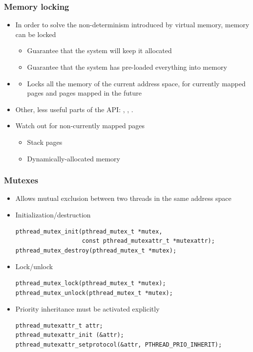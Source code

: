 \begin{frame}
  \frametitle{Memory locking}
  \begin{itemize}
  \item In order to solve the non-determinism introduced by virtual
    memory, memory can be locked
    \begin{itemize}
    \item Guarantee that the system will keep it allocated
    \item Guarantee that the system has pre-loaded everything into
      memory
    \end{itemize}
  \item {}
    \begin{itemize}
    \item Locks all the memory of the current address space, for
      currently mapped pages and pages mapped in the future
    \end{itemize}
  \item Other, less useful parts of the API: , ,
    .
  \item Watch out for non-currently mapped pages
    \begin{itemize}
    \item Stack pages
    \item Dynamically-allocated memory
    \end{itemize}
  \end{itemize}
\end{frame}

\begin{frame}[fragile]
  \frametitle{Mutexes}
  \begin{itemize}
  \item Allows mutual exclusion between two threads in the same
    address space
  \item Initialization/destruction
    \begin{block}{}
\footnotesize
\begin{verbatim}
pthread_mutex_init(pthread_mutex_t *mutex,
                   const pthread_mutexattr_t *mutexattr);
pthread_mutex_destroy(pthread_mutex_t *mutex);
\end{verbatim}
\normalsize
    \end{block}
  \item Lock/unlock
    \begin{block}{}
\footnotesize
\begin{verbatim}
pthread_mutex_lock(pthread_mutex_t *mutex);
pthread_mutex_unlock(pthread_mutex_t *mutex);
\end{verbatim}
\normalsize
    \end{block}
  \item Priority inheritance must be activated explicitly
    \begin{block}{}
\footnotesize
\begin{verbatim}
pthread_mutexattr_t attr;
pthread_mutexattr_init (&attr);
pthread_mutexattr_setprotocol(&attr, PTHREAD_PRIO_INHERIT);
\end{verbatim}
\normalsize
    \end{block}
  \end{itemize}
\end{frame}

